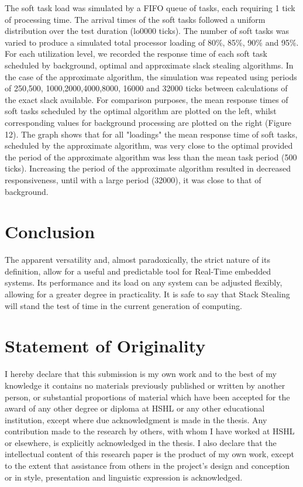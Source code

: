 \documentclass[conference]{IEEEtran}
\begin{document}
The soft task load was simulated by a FIFO queue of
tasks, each requiring 1 tick of processing time. The arrival
times of the soft tasks followed a uniform distribution
over the test duration (lo0000 ticks). The number of soft
tasks was varied to produce a simulated total processor
loading of 80\%, 85\%, 90\% and 95\%. For each utilization
level, we recorded the response time of each soft task
scheduled by background, optimal and approximate slack
stealing algorithms. In the case of the approximate
algorithm, the simulation was repeated using periods of
250,500, 1000,2000,4000,8000, 16000 and 32000 ticks
between calculations of the exact slack available.
For comparison purposes, the mean
response times of soft tasks scheduled by the optimal
algorithm are plotted on the left, whilst corresponding
values for background processing are plotted on the right (Figure 12).
The graph shows that for all "loadings" the mean response
time of soft tasks, scheduled by the approximate
algorithm, was very close to the optimal provided the
period of the approximate algorithm was less than the
mean task period (500 ticks). Increasing the period of the
approximate algorithm resulted in decreased
responsiveness, until with a large period (32000), it was
close to that of background.

\section{Conclusion}
The apparent versatility and, almost paradoxically, the strict nature of its definition, allow for a useful and predictable tool for Real-Time embedded systems. Its performance and its load on any system can be adjusted flexibly, allowing for a greater degree in practicality. It is safe to say that Stack Stealing will stand the test of time in the current generation of computing. 

\section{Statement of Originality}
I hereby declare that this submission is my own work and to the best of my
knowledge it contains no materials previously published or written by another
person, or substantial proportions of material which have been accepted for the
award of any other degree or diploma at HSHL or any other educational
institution, except where due acknowledgment is made in the thesis. Any
contribution made to the research by others, with whom I have worked at
HSHL or elsewhere, is explicitly acknowledged in the thesis. I also declare that
the intellectual content of this research paper is the product of my own work, except to
the extent that assistance from others in the project's design and conception or
in style, presentation and linguistic expression is acknowledged.
\end{document}

